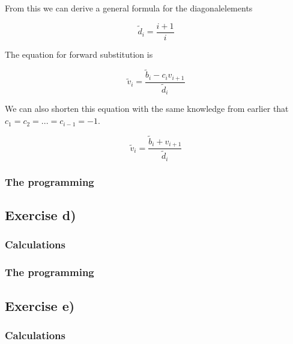 \documentclass{article}
\begin{document}
    From this we can derive a general formula for the diagonalelements

    \begin{equation*}
      \tilde{d}_i = \frac{i+1}{i}
    \end{equation*}

    The equation for forward substitution is

    \begin{equation*}
      \tilde{v}_i = \frac{\tilde{b}_i - c_i v_{i+1}}{\tilde{d}_i}
    \end{equation*}

    We can also shorten this equation with the same knowledge from earlier that $c_1 = c_2 = ... = c_{i-1} = -1$.

    \begin{equation*}
      \tilde{v}_i = \frac{\tilde{b}_i + v_{i+1}}{\tilde{d}_i}
    \end{equation*}

  \subsubsection{The programming}




\subsection{Exercise d)}




  \subsubsection{Calculations}




  \subsubsection{The programming}




\subsection{Exercise e)}




  \subsubsection{Calculations}
\end{document}
